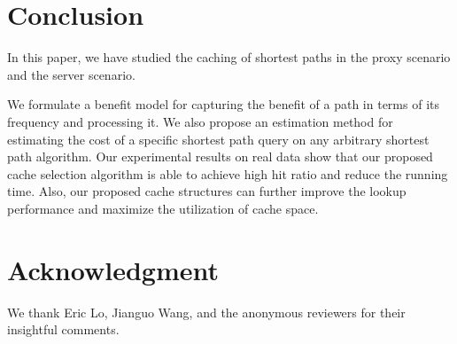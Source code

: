 \documentclass{sig-alternate}
\newcommand{\spath}{SP\xspace}
\begin{document}







%
%











\section{Conclusion}\label{sec:conclusion}
%
In this paper, we have studied the caching of shortest paths in the proxy scenario and the server scenario.

We formulate a benefit model for capturing the benefit of a path in terms of its frequency and processing it.
We also propose an estimation method for estimating the cost of a specific shortest path query on any arbitrary
shortest path algorithm.
Our experimental results on real data show that our proposed cache selection algorithm is able to
achieve high hit ratio and reduce the running time.
Also, our proposed cache structures can further improve the lookup performance and maximize the utilization of cache space.




\section*{Acknowledgment}
%
We thank Eric Lo, Jianguo Wang, and the anonymous reviewers for their insightful comments.





\end{document}
